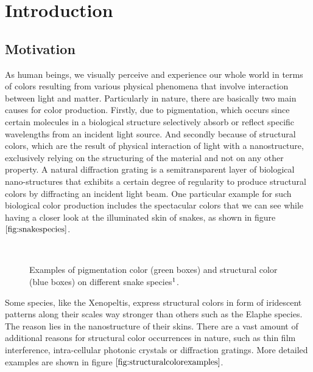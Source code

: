 \chapter{Introduction}
\section{Motivation}
As human beings, we visually perceive and experience our whole world in terms of colors resulting from various physical phenomena that involve interaction between light and matter. Particularly in nature, there are basically two main causes for color production. Firstly, due to pigmentation, which occurs since certain molecules in a biological structure selectively absorb or reflect specific wavelengths from an incident light source. And secondly because of structural colors, which are the result of physical interaction of light with a nanostructure, exclusively relying on the structuring of the material and not on any other property. A natural diffraction grating is a semitransparent layer of biological nano-structures that exhibits a certain degree of regularity to produce structural colors by diffracting an incident light beam. One particular example for such biological color production includes the spectacular colors that we can see while having a closer look at the illuminated skin of snakes, as shown in figure $\ref{fig:snakespecies}$.

\begin{figure}[H]
  \centering
~
  \caption[Example of Biological Color Production]{Examples of pigmentation color (green boxes) and structural color (blue boxes) on different snake species$\footnotemark$.}
  \label{fig:snakespecies}
\end{figure}
\noindent
Some species, like the Xenopeltis, express structural colors in form of iridescent patterns along their scales way stronger than others such as the Elaphe species. The reason lies in the nanostructure of their skins. There are a vast amount of additional reasons for structural color occurrences in nature, such as thin film interference, intra-cellular photonic crystals or diffraction gratings. More detailed examples are shown in figure $\ref{fig:structuralcolorexamples}$. 

